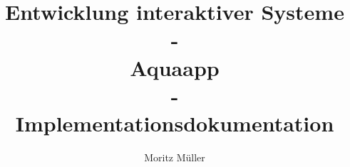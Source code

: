 \documentclass[12pt,a4paper,ngerman]{scrreprt}
\begin{document}
 \title{Entwicklung interaktiver Systeme\\
  -\\
 Aquaapp\\
 -\\
 Implementationsdokumentation}
\author{Moritz Müller}
\maketitle
\tableofcontents









\listoffigures
\printbibliography
\appendix
\end{document}
